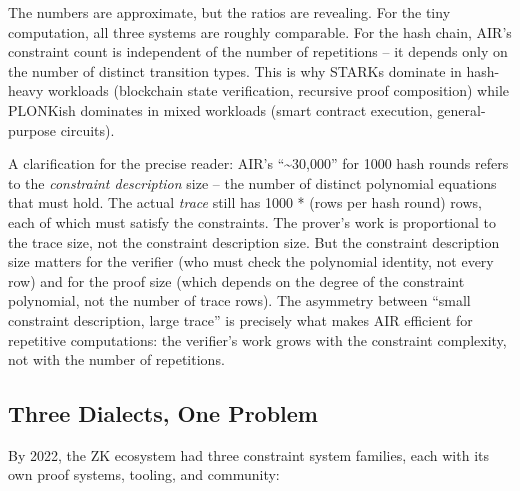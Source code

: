 \documentclass[
  11pt,
  openany]{report}
\begin{document}
The numbers are approximate, but the ratios are revealing. For the tiny
computation, all three systems are roughly comparable. For the hash chain, AIR's
constraint count is independent of the number of repetitions -- it depends only
on the number of distinct transition types. This is why STARKs dominate in
hash-heavy workloads (blockchain state verification, recursive proof
composition) while PLONKish dominates in mixed workloads (smart contract
execution, general-purpose circuits).

A clarification for the precise reader: AIR's ``\textasciitilde30,000'' for 1000
hash rounds refers to the \emph{constraint description} size -- the number of
distinct polynomial equations that must hold. The actual \emph{trace} still has
1000 * (rows per hash round) rows, each of which must satisfy the constraints.
The prover's work is proportional to the trace size, not the constraint
description size. But the constraint description size matters for the verifier
(who must check the polynomial identity, not every row) and for the proof size
(which depends on the degree of the constraint polynomial, not the number of
trace rows). The asymmetry between ``small constraint description, large trace''
is precisely what makes AIR efficient for repetitive computations: the
verifier's work grows with the constraint complexity, not with the number of
repetitions.

\subsection{Three Dialects, One Problem}\label{three-dialects-one-problem}

By 2022, the ZK ecosystem had three constraint system families, each with its
own proof systems, tooling, and community:
\end{document}
